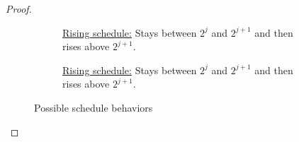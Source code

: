 \begin{proof}
\begin{figure}[H]
\begin{subfigure}[b]{0.47\textwidth}
\caption{\underline{Rising schedule:} Stays between $2^j$ and $2^{j+1}$ and then rises above $2^{j+1}$.}
\end{subfigure}
\hfill
\begin{subfigure}[b]{0.47\textwidth}
	
\caption{\underline{Rising schedule:} Stays between $2^j$ and $2^{j+1}$ and then rises above $2^{j+1}$.}
\end{subfigure}
\caption{Possible schedule behaviors}
\end{figure}

\end{proof}
